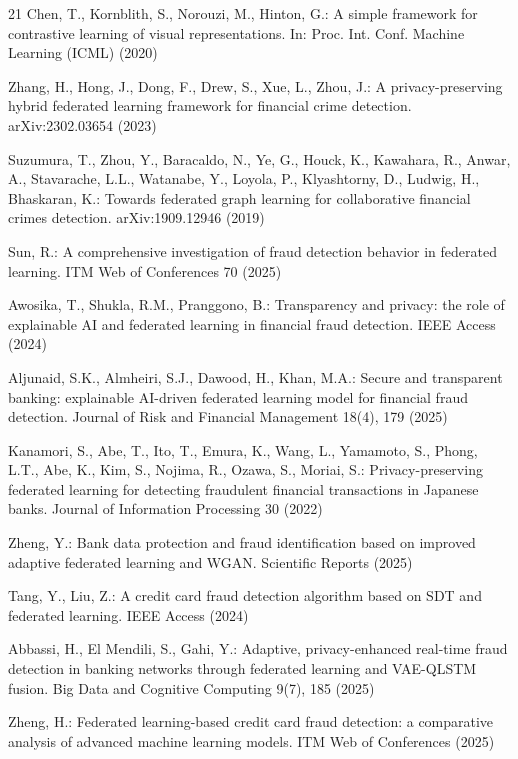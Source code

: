 \documentclass[12pt]{svproc}
\begin{document}
\begin{thebibliography}{21}
Chen, T., Kornblith, S., Norouzi, M., Hinton, G.: A simple framework for
contrastive learning of visual representations. In: Proc. Int. Conf.
Machine Learning (ICML) (2020)

Zhang, H., Hong, J., Dong, F., Drew, S., Xue, L., Zhou, J.: A
privacy-preserving hybrid federated learning framework for financial
crime detection. arXiv:2302.03654 (2023)

Suzumura, T., Zhou, Y., Baracaldo, N., Ye, G., Houck, K., Kawahara, R.,
Anwar, A., Stavarache, L.L., Watanabe, Y., Loyola, P., Klyashtorny, D.,
Ludwig, H., Bhaskaran, K.: Towards federated graph learning for
collaborative financial crimes detection. arXiv:1909.12946 (2019)

Sun, R.: A comprehensive investigation of fraud detection behavior in
federated learning. ITM Web of Conferences 70 (2025)

Awosika, T., Shukla, R.M., Pranggono, B.: Transparency and privacy: the
role of explainable AI and federated learning in financial fraud
detection. IEEE Access (2024)

Aljunaid, S.K., Almheiri, S.J., Dawood, H., Khan, M.A.: Secure and
transparent banking: explainable AI-driven federated learning model for
financial fraud detection. Journal of Risk and Financial Management
18(4), 179 (2025)

Kanamori, S., Abe, T., Ito, T., Emura, K., Wang, L., Yamamoto, S.,
Phong, L.T., Abe, K., Kim, S., Nojima, R., Ozawa, S., Moriai, S.:
Privacy-preserving federated learning for detecting fraudulent financial
transactions in Japanese banks. Journal of Information Processing 30
(2022)

Zheng, Y.: Bank data protection and fraud identification based on
improved adaptive federated learning and WGAN. Scientific Reports
(2025)

Tang, Y., Liu, Z.: A credit card fraud detection algorithm based on SDT
and federated learning. IEEE Access (2024)

Abbassi, H., El Mendili, S., Gahi, Y.: Adaptive, privacy-enhanced
real-time fraud detection in banking networks through federated
learning and VAE-QLSTM fusion. Big Data and Cognitive Computing 9(7),
185 (2025)

Zheng, H.: Federated learning-based credit card fraud detection: a
comparative analysis of advanced machine learning models. ITM Web of
Conferences (2025)

\end{thebibliography}
\end{document}
